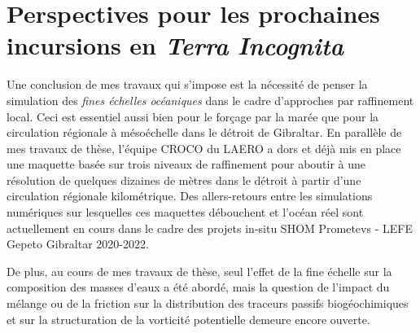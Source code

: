 \section{Perspectives pour les prochaines incursions en \textit{Terra Incognita}}
Une conclusion de mes travaux qui s'impose est la nécessité de penser la simulation des \textit{fines échelles océaniques} dans le cadre d'approches par raffinement local. Ceci est essentiel aussi bien pour le forçage par la marée que pour la circulation régionale à mésoéchelle dans le détroit de Gibraltar. En parallèle de mes travaux de thèse, l'équipe CROCO du LAERO a dors et déjà mis en place une maquette basée sur trois niveaux de raffinement pour aboutir à une résolution de quelques dizaines de mètres dans le détroit à partir d'une circulation régionale kilométrique. Des allers-retours entre les simulations numériques sur lesquelles ces maquettes débouchent et l'océan réel sont actuellement en cours dans le cadre des projets in-situ SHOM Prometevs - LEFE Gepeto Gibraltar 2020-2022.

De plus, au cours de mes travaux de thèse, seul l'effet de la fine échelle sur la composition des masses d'eaux a été abordé, mais la question de l'impact du mélange ou de la friction sur la distribution des traceurs passifs biogéochimiques \citep{penney_2020} et sur la structuration de la vorticité potentielle \citep{morel_potential_2019} demeure encore ouverte.

